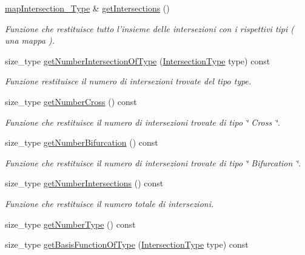\begin{DoxyCompactItemize}
\hyperlink{classFractureIntersect_a4eea7d0aca48cdd36ea1756e75280332}{map\-Intersection\-\_\-\-Type} \& \hyperlink{classFractureIntersect_a1b785b0ed94d3a403b9f0e21f092b4ab}{get\-Intersections} ()
\begin{DoxyCompactList}\small\item\em Funzione che restituisce tutto l'insieme delle intersezioni con i rispettivi tipi ( una mappa ). \end{DoxyCompactList}\item 
size\-\_\-type \hyperlink{classFractureIntersect_a1cd070dda9460d884c1b1d92edfecc12}{get\-Number\-Intersection\-Of\-Type} (\hyperlink{classFractureIntersect_a9a4e4a784fa4c8e359767ed543f89dc5}{Intersection\-Type} type) const 
\begin{DoxyCompactList}\small\item\em Funzione restituisce il numero di intersezioni trovate del tipo type. \end{DoxyCompactList}\item 
size\-\_\-type \hyperlink{classFractureIntersect_a8d9f707319b9b83744b6e03f19003734}{get\-Number\-Cross} () const 
\begin{DoxyCompactList}\small\item\em Funzione che restituisce il numero di intersezioni trovate di tipo \char`\"{} Cross \char`\"{}. \end{DoxyCompactList}\item 
size\-\_\-type \hyperlink{classFractureIntersect_afba7c92096a4b92a27fcb4f1158c7279}{get\-Number\-Bifurcation} () const 
\begin{DoxyCompactList}\small\item\em Funzione che restituisce il numero di intersezioni trovate di tipo \char`\"{} Bifurcation \char`\"{}. \end{DoxyCompactList}\item 
size\-\_\-type \hyperlink{classFractureIntersect_aaff97a1338251e796ce44db631961459}{get\-Number\-Intersections} () const 
\begin{DoxyCompactList}\small\item\em Funzione che restituisce il numero totale di intersezioni. \end{DoxyCompactList}\item 
size\-\_\-type \hyperlink{classFractureIntersect_a86195f7e54a79412d2d54fa5efad9af2}{get\-Number\-Type} () const 
\item 
size\-\_\-type \hyperlink{classFractureIntersect_a8293ef859c572a375c7c5f6e79399b1e}{get\-Basis\-Function\-Of\-Type} (\hyperlink{classFractureIntersect_a9a4e4a784fa4c8e359767ed543f89dc5}{Intersection\-Type} type) const 

\end{DoxyCompactItemize}
